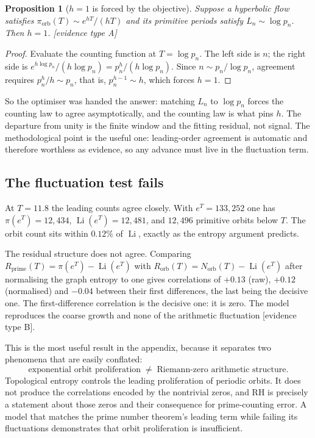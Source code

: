 \documentclass[11pt]{article}
\newtheorem{proposition}[theorem]{Proposition}
\begin{document}
\begin{proposition}[$h=1$ is forced by the objective]\label{prop:hforced}
Suppose a hyperbolic flow satisfies $\pi_{\mathrm{orb}}(T)\sim e^{hT}/(hT)$ and its
primitive periods satisfy $L_n\sim\log p_n$. Then $h=1$. [evidence type A]
\end{proposition}
\begin{proof}
Evaluate the counting function at $T=\log p_n$. The left side is $n$; the right side is
$e^{h\log p_n}/(h\log p_n)=p_n^{h}/(h\log p_n)$. Since $n\sim p_n/\log p_n$, agreement
requires $p_n^{h}/h\sim p_n$, that is, $p_n^{h-1}\sim h$, which forces $h=1$.
\end{proof}

So the optimiser was handed the answer: matching $L_n$ to $\log p_n$ forces the counting
law to agree asymptotically, and the counting law is what pins $h$. The departure from
unity is the finite window and the fitting residual, not signal. The methodological
point is the useful one: leading-order agreement is automatic and therefore worthless as
evidence, so any advance must live in the fluctuation term.

\subsection{The fluctuation test fails}

At $T=11.8$ the leading counts agree closely. With $e^T=133{,}252$ one has
$\pi(e^T)=12{,}434$, $\operatorname{Li}(e^T)=12{,}481$, and $12{,}496$ primitive orbits
below $T$. The orbit count sits within $0.12\%$ of $\operatorname{Li}$, exactly as the
entropy argument predicts.

The residual structure does not agree. Comparing
$R_{\mathrm{prime}}(T)=\pi(e^T)-\operatorname{Li}(e^T)$ with
$R_{\mathrm{orb}}(T)=N_{\mathrm{orb}}(T)-\operatorname{Li}(e^T)$ after normalising the
graph entropy to one gives correlations of $+0.13$ (raw), $+0.12$ (normalised) and
$-0.04$ between their first differences, the last being the decisive one. The first-difference correlation is the
decisive one: it is zero. The model reproduces the coarse growth and none of the
arithmetic fluctuation [evidence type B].

This is the most useful result in the appendix, because it separates two phenomena that
are easily conflated:
\begin{equation}
\boxed{\text{exponential orbit proliferation}\;\neq\;\text{Riemann-zero arithmetic structure}.}
\end{equation}
Topological entropy controls the leading proliferation of periodic orbits. It does not
produce the correlations encoded by the nontrivial zeros, and RH is precisely a
statement about those zeros and their consequence for prime-counting error. A model that
matches the prime number theorem's leading term while failing its fluctuations
demonstrates that orbit proliferation is insufficient.
\end{document}
